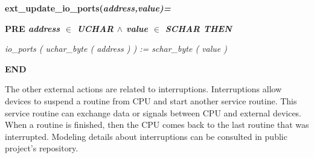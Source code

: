 \documentclass[a4paper]{llncs}
\begin{document}
\hspace*{0.20in}\bf ext\_update\_io\_ports\rm (\it address\rm ,\it value\rm )\rm =

\hspace*{0.20in}\bf PRE \it address  $\in$  \it UCHAR  $\land$ \hspace*{0.10in}\it value  $\in$  \it SCHAR \bf THEN

\hspace*{0.40in}\it io\_ports \rm ( \it uchar\_byte \rm ( \it address \rm ) \rm ) \rm := \it schar\_byte \rm ( \it
value \rm )

\hspace*{0.20in}\bf END\rm 

The other external actions are related to interruptions. Interruptions allow
devices to suspend a routine from CPU and start another service routine.
This service routine can exchange data or signals between CPU and external
devices. When a routine is finished, then the CPU comes back to the last routine
that was interrupted. Modeling details about interruptions can be consulted in
public project's repository.
\end{document}
